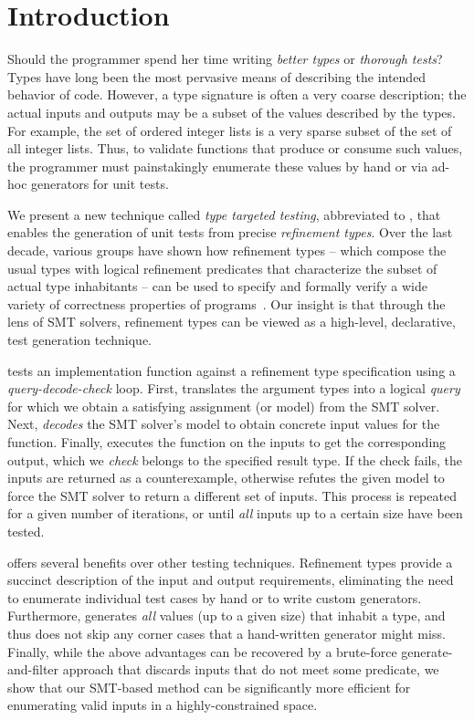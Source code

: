 \section{Introduction}\label{sec:intro}

Should the programmer spend her time writing \emph{better types}
or \emph{thorough tests}?  
%
Types have long been the most pervasive means of describing the 
intended behavior of code. However, a type signature is often a 
very coarse description; the actual inputs and outputs
may be a subset of the values described by the types. 
%
For example, the set of ordered integer lists is a very 
sparse subset of the set of all integer lists. 
%
Thus, to validate functions that produce or consume such values, 
the programmer must painstakingly enumerate these values by hand 
or via ad-hoc generators for unit tests.

We present a new technique called \emph{type targeted testing}, 
abbreviated to \toolname, that enables the generation of unit
tests from precise \emph{refinement types}.
%
Over the last decade, various groups have shown how refinement 
types -- which compose the usual types with logical refinement predicates
that characterize the subset of actual type inhabitants -- 
can be used to specify and formally verify a wide variety 
of correctness properties of programs~\cite{pfenningxi98,Dunfield07,fstar,VazouICFP14}.
%
Our insight is that through the lens of SMT
solvers, refinement types can be viewed as a high-level, 
declarative, test generation technique.

\toolname tests an implementation function against a refinement 
type specification using a \emph{query-decode-check} loop.
%
First, \toolname translates the argument types into a logical
\emph{query} for which we obtain a satisfying assignment 
(or model) from the SMT solver.
%
Next, \toolname \emph{decodes} the SMT solver's model to obtain
concrete input values for the function.
%
Finally, \toolname executes the function on the inputs 
to get the corresponding output, which we \emph{check} 
belongs to the specified result type. 
%
If the check fails, the inputs are returned as a counterexample, 
otherwise
%
\toolname refutes the given model to force the SMT solver to 
return a different set of inputs. 
%
This process is repeated for a given number of 
iterations, or until \emph{all} inputs up to a certain size 
have been tested.

\toolname offers several benefits over other testing techniques.
%
Refinement types provide a succinct description of the 
input and output requirements, eliminating the need to 
enumerate individual test cases by hand or to write 
custom generators.
%
Furthermore, \toolname generates \emph{all} 
values (up to a given size) that inhabit a type, and thus
does not skip any corner cases that a hand-written generator 
might miss.
%
Finally, while the above advantages can be recovered by a brute-force
generate-and-filter approach that discards inputs that do not meet
some predicate, we show that our SMT-based method can be significantly
more efficient for enumerating valid inputs in a highly-constrained space.

